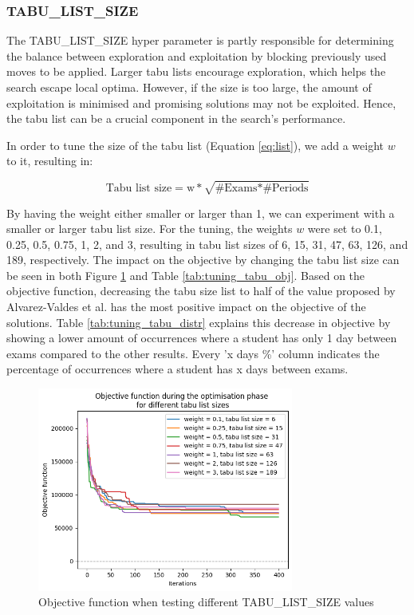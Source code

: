 \subsubsection{TABU\_LIST\_SIZE }

The TABU\_LIST\_SIZE hyper parameter is partly responsible for determining the balance between exploration and exploitation by blocking previously used moves to be applied. Larger tabu lists encourage exploration, which helps the search escape local optima. However, if the size is too large, the amount of exploitation is minimised and promising solutions may not be exploited. Hence, the tabu list can be a crucial component in the search's performance.

In order to tune the size of the tabu list (Equation \ref{eq:list}), we add a weight $w$ to it, resulting in:

\begin{equation}
    \text{Tabu list size} = \text{w} * \sqrt{\text{\# Exams} * \text{\# Periods}}
\end{equation}

By having the weight either smaller or larger than 1, we can experiment with a smaller or larger tabu list size. For the tuning, the weights $w$ were set to 0.1, 0.25, 0.5, 0.75, 1, 2, and 3, resulting in tabu list sizes of 6, 15, 31, 47, 63, 126, and 189, respectively. The impact on the objective by changing the tabu list size can be seen in both Figure \ref{fig:tuning_tabu} and Table \ref{tab:tuning_tabu_obj}. Based on the objective function, decreasing the tabu size list to half of the value proposed by Alvarez-Valdes et al. has the most positive impact on the objective of the solutions. Table \ref{tab:tuning_tabu_distr} explains this  decrease in objective by showing a lower amount of occurrences where a student has only 1 day between exams compared to the other results. Every 'x days \%' column indicates the percentage of occurrences where a student has x days between exams. 

\begin{figure}[H]
	\centering
	\includegraphics[width=0.75\textwidth]{images/tuning/tabu_list.png} 
	\caption{Objective function when testing different TABU\_LIST\_SIZE values}
	\label{fig:tuning_tabu}
\end{figure}

